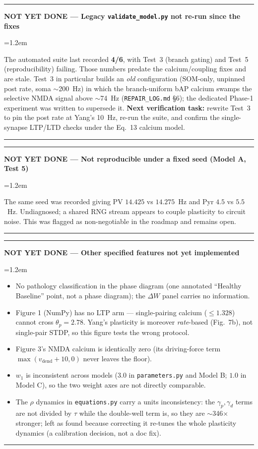 \documentclass[11pt,a4paper]{article}
\newenvironment{gapbox}[1]{%
  \par\medskip\noindent
  \textcolor{gapred}{\rule{\linewidth}{1.1pt}}\par\nobreak\vspace{2pt}%
  \noindent\textcolor{gapred}{\textbf{NOT YET DONE --- #1}}%
  \par\nobreak\vspace{3pt}%
  \begingroup\leftskip=1.2em\relax\small
}{%
  \par\endgroup\vspace{3pt}%
  \noindent\textcolor{gapred}{\rule{\linewidth}{0.5pt}}\par\medskip
}
\begin{document}
\begin{gapbox}{Legacy \texttt{validate\_model.py} not re-run since the fixes}
The automated suite last recorded \textbf{4/6}, with Test~3 (branch gating) and Test~5
(reproducibility) failing. Those numbers predate the calcium/coupling fixes and are stale.
Test~3 in particular builds an \emph{old} configuration (SOM-only, unpinned post rate, soma
$\sim$200~Hz) in which the branch-uniform bAP calcium swamps the selective NMDA signal
above $\sim$74~Hz (\texttt{REPAIR\_LOG.md} \S6); the dedicated Phase-1 experiment was
written to supersede it. \textbf{Next verification task:} rewrite Test~3 to pin the post
rate at Yang's 10~Hz, re-run the suite, and confirm the single-synapse LTP/LTD checks under
the Eq.~13 calcium model.
\end{gapbox}

\begin{gapbox}{Not reproducible under a fixed seed (Model A, Test 5)}
The same seed was recorded giving PV $14.425$ vs $14.275$~Hz and Pyr $4.5$ vs $5.5$~Hz.
Undiagnosed; a shared RNG stream appears to couple plasticity to circuit noise. This was
flagged as non-negotiable in the roadmap and remains open.
\end{gapbox}

\begin{gapbox}{Other specified features not yet implemented}
\begin{itemize}
    \item No pathology classification in the phase diagram (one annotated ``Healthy
      Baseline'' point, not a phase diagram); the $\Delta W$ panel carries no information.
    \item Figure 1 (NumPy) has no LTP arm --- single-pairing calcium ($\le1.328$) cannot
      cross $\theta_p=2.78$. Yang's plasticity is moreover \emph{rate}-based (Fig.~7b), not
      single-pair STDP, so this figure tests the wrong protocol.
    \item Figure 3's NMDA calcium is identically zero (its driving-force term
      $\max(v_{\text{dend}}+10,0)$ never leaves the floor).
    \item $w_1$ is inconsistent across models ($3.0$ in \texttt{parameters.py} and Model B;
      $1.0$ in Model C), so the two weight axes are not directly comparable.
    \item The $\rho$ dynamics in \texttt{equations.py} carry a units inconsistency: the
      $\gamma_p,\gamma_d$ terms are not divided by $\tau$ while the double-well term is, so
      they are $\sim$346$\times$ stronger; left as found because correcting it re-tunes the
      whole plasticity dynamics (a calibration decision, not a doc fix).
\end{itemize}
\end{gapbox}
\end{document}
